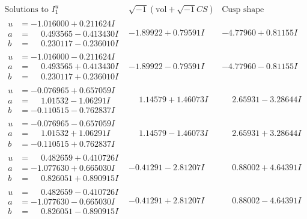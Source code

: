\documentclass[1p]{elsarticle_modified}
\theoremstyle{definition}
\newcommand{\I}{\sqrt{-1}}
\begin{document}
$$\begin{array}{c|c|c}  
\text{Solutions to }I^u_{1}& \I (\text{vol} + \sqrt{-1}CS) & \text{Cusp shape}\\
 \hline 
\begin{aligned}
u &= -1.016000 + 0.211624 I \\
a &= \phantom{-}0.493565 - 0.413430 I \\
b &= \phantom{-}0.230117 - 0.236010 I\end{aligned}
 & -1.89922 + 0.79591 I & -4.77960 + 0.81155 I \\ \hline\begin{aligned}
u &= -1.016000 - 0.211624 I \\
a &= \phantom{-}0.493565 + 0.413430 I \\
b &= \phantom{-}0.230117 + 0.236010 I\end{aligned}
 & -1.89922 - 0.79591 I & -4.77960 - 0.81155 I \\ \hline\begin{aligned}
u &= -0.076965 + 0.657059 I \\
a &= \phantom{-}1.01532 - 1.06291 I \\
b &= -0.110515 - 0.762837 I\end{aligned}
 & \phantom{-}1.14579 + 1.46073 I & \phantom{-}2.65931 - 3.28644 I \\ \hline\begin{aligned}
u &= -0.076965 - 0.657059 I \\
a &= \phantom{-}1.01532 + 1.06291 I \\
b &= -0.110515 + 0.762837 I\end{aligned}
 & \phantom{-}1.14579 - 1.46073 I & \phantom{-}2.65931 + 3.28644 I \\ \hline\begin{aligned}
u &= \phantom{-}0.482659 + 0.410726 I \\
a &= -1.077630 + 0.665030 I \\
b &= \phantom{-}0.826051 + 0.890915 I\end{aligned}
 & -0.41291 - 2.81207 I & \phantom{-}0.88002 + 4.64391 I \\ \hline\begin{aligned}
u &= \phantom{-}0.482659 - 0.410726 I \\
a &= -1.077630 - 0.665030 I \\
b &= \phantom{-}0.826051 - 0.890915 I\end{aligned}
 & -0.41291 + 2.81207 I & \phantom{-}0.88002 - 4.64391 I \\ \hline\begin{aligned}

\end{aligned}
\end{array}$$
\end{document}
